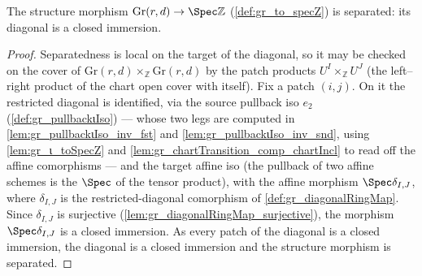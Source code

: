 \begin{lemma}\leanok
  \label{lem:gr_separated_toSpecZ}
  The structure morphism \(\mathrm{Gr}(r,d) \to \Spec \mathbb{Z}\)
  (\cref{def:gr_to_specZ}) is separated: its diagonal is a closed immersion.
\end{lemma}
\begin{proof}
    \leanok
  Separatedness is local on the target of the diagonal, so it may be checked on
  the cover of \(\mathrm{Gr}(r,d) \times_{\mathbb{Z}} \mathrm{Gr}(r,d)\) by the
  patch products \(U^I \times_{\mathbb{Z}} U^J\) (the left--right product of the
  chart open cover with itself). Fix a patch \((i,j)\). On it the restricted
  diagonal is identified, via the source pullback iso \(e_2\)
  (\cref{def:gr_pullbackιIso}) — whose two legs are computed in
  \cref{lem:gr_pullbackιIso_inv_fst} and \cref{lem:gr_pullbackιIso_inv_snd},
  using \cref{lem:gr_ι_toSpecZ} and \cref{lem:gr_chartTransition_comp_chartIncl}
  to read off the affine comorphisms — and the target affine iso (the pullback of
  two affine schemes is the \(\Spec\) of the tensor product), with the affine
  morphism \(\Spec \delta_{I,J}\), where \(\delta_{I,J}\) is the
  restricted-diagonal comorphism of \cref{def:gr_diagonalRingMap}. Since
  \(\delta_{I,J}\) is surjective (\cref{lem:gr_diagonalRingMap_surjective}), the
  morphism \(\Spec \delta_{I,J}\) is a closed immersion. As every patch of the
  diagonal is a closed immersion, the diagonal is a closed immersion and the
  structure morphism is separated.
\end{proof}

